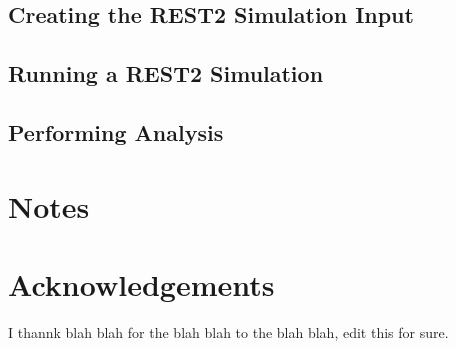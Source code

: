 \documentclass{memoir}
\begin{document}
\subsection{Creating the REST2 Simulation Input}

\subsection{Running a REST2 Simulation}

\subsection{Performing Analysis}


\section{Notes}






\section{Acknowledgements}
I thannk blah blah for the blah blah to the blah blah, edit this for sure.


\end{document}
